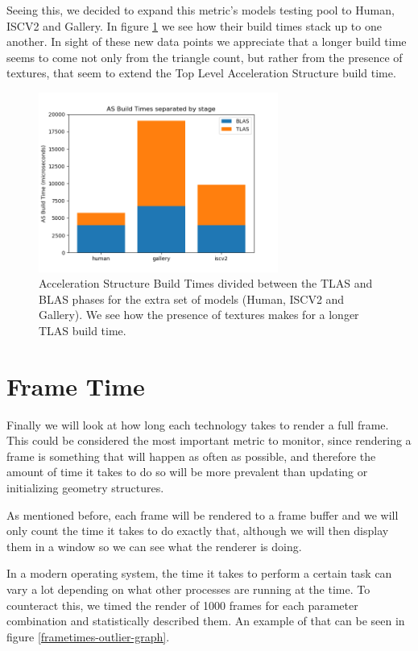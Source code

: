 Seeing this, we decided to expand this metric's models testing pool to Human, ISCV2 and Gallery. In figure \ref{as-extra-build-time-decomposed} we see how their build times stack up to one another. In sight of these new data points we appreciate that a longer build time seems to come not only from the triangle count, but rather from the presence of textures, that seem to extend the Top Level Acceleration Structure build time.


\begin{figure}[hbt!]
    \centering
    \includegraphics[width=0.7\textwidth]{figuras/optix-extra-accelbuildtimes-decomposed.png}
    \caption{Acceleration Structure Build Times divided between the TLAS and BLAS phases for the extra set of models (Human, ISCV2 and Gallery). We see how the presence of textures makes for a longer TLAS build time.}
    \label{as-extra-build-time-decomposed}
\end{figure}


\clearpage
\section{Frame Time}
Finally we will look at how long each technology takes to render a full frame. This could be considered the most important metric to monitor, since rendering a frame is something that will happen as often as possible, and therefore the amount of time it takes to do so will be more prevalent than updating or initializing geometry structures.

As mentioned before, each frame will be rendered to a frame buffer and we will only count the time it takes to do exactly that, although we will then display them in a window so we can see what the renderer is doing.

In a modern operating system, the time it takes to perform a certain task can vary a lot depending on what other processes are running at the time. To counteract this, we timed the render of 1000 frames for each parameter combination and statistically described them. An example of that can be seen in figure \ref{frametimes-outlier-graph}.

